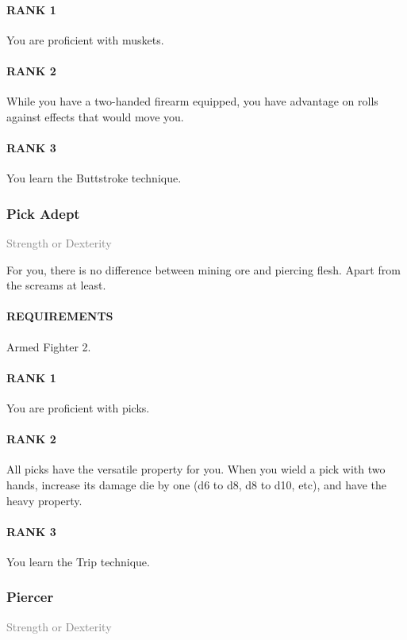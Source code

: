 \paragraph{RANK 1} You are proficient with muskets.
\paragraph{RANK 2} While you have a two-handed firearm equipped, you have advantage on rolls against effects that would move you.
\paragraph{RANK 3} You learn the Buttstroke technique.

\subsubsection{Pick Adept} \label{feat::pickadept}
\small{\textcolor{gray}{Strength or Dexterity}}

\normalsize
For you, there is no difference between mining ore and piercing flesh.
Apart from the screams at least.
\paragraph{REQUIREMENTS} Armed Fighter 2.
\paragraph{RANK 1} You are proficient with picks.
\paragraph{RANK 2} All picks have the versatile property for you.
When you wield a pick with two hands, increase its damage die by one (d6 to d8, d8 to d10, etc), and have the heavy property.
\paragraph{RANK 3} You learn the Trip technique.

\subsubsection{Piercer} \label{feat::piercer}
\small{\textcolor{gray}{Strength or Dexterity}}

